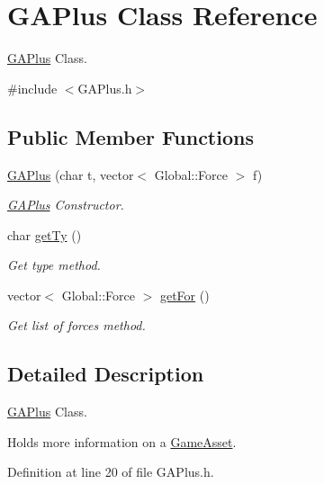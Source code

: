 \hypertarget{classGAPlus}{\section{G\-A\-Plus Class Reference}
\label{classGAPlus}
}


\hyperlink{classGAPlus}{G\-A\-Plus} Class.  




{\ttfamily \#include $<$G\-A\-Plus.\-h$>$}

\subsection*{Public Member Functions}
\begin{DoxyCompactItemize}
\item 
\hyperlink{classGAPlus_ac6953ed1932735d5f916b24f1298f3ab}{G\-A\-Plus} (char t, vector$<$ Global\-::\-Force $>$ f)
\begin{DoxyCompactList}\small\item\em \hyperlink{classGAPlus}{G\-A\-Plus} Constructor. \end{DoxyCompactList}\item 
char \hyperlink{classGAPlus_aadfbeaa73754fc498542ee0faa879912}{get\-Ty} ()
\begin{DoxyCompactList}\small\item\em Get type method. \end{DoxyCompactList}\item 
vector$<$ Global\-::\-Force $>$ \hyperlink{classGAPlus_a424b0920996c254e25f95f03d553d7d7}{get\-For} ()
\begin{DoxyCompactList}\small\item\em Get list of forces method. \end{DoxyCompactList}\end{DoxyCompactItemize}


\subsection{Detailed Description}
\hyperlink{classGAPlus}{G\-A\-Plus} Class. 

Holds more information on a \hyperlink{classGameAsset}{Game\-Asset}. 

Definition at line 20 of file G\-A\-Plus.\-h.




